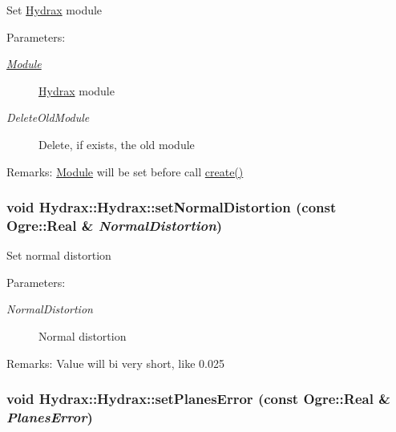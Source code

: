 Set \hyperlink{class_hydrax_1_1_hydrax}{Hydrax} module \begin{Desc}
\item[Parameters:]
\begin{description}
\item[{\em \hyperlink{namespace_hydrax_1_1_module}{Module}}]\hyperlink{class_hydrax_1_1_hydrax}{Hydrax} module \item[{\em DeleteOldModule}]Delete, if exists, the old module \end{description}
\end{Desc}
\begin{Desc}
\item[Remarks:]\hyperlink{namespace_hydrax_1_1_module}{Module} will be set before call \hyperlink{class_hydrax_1_1_hydrax_af840e19208614533a6b344e32965ee2}{create()} \end{Desc}
\hypertarget{class_hydrax_1_1_hydrax_b745c19968fdc47b71d65bb88679d447}{
\subsubsection[{setNormalDistortion}]{\setlength{\rightskip}{0pt plus 5cm}void Hydrax::Hydrax::setNormalDistortion (const Ogre::Real \& {\em NormalDistortion})}}
\label{class_hydrax_1_1_hydrax_b745c19968fdc47b71d65bb88679d447}


Set normal distortion \begin{Desc}
\item[Parameters:]
\begin{description}
\item[{\em NormalDistortion}]Normal distortion \end{description}
\end{Desc}
\begin{Desc}
\item[Remarks:]Value will bi very short, like 0.025 \end{Desc}
\hypertarget{class_hydrax_1_1_hydrax_336c1b2587e8e26c123af6c5bdbc2400}{
\subsubsection[{setPlanesError}]{\setlength{\rightskip}{0pt plus 5cm}void Hydrax::Hydrax::setPlanesError (const Ogre::Real \& {\em PlanesError})}}
\label{class_hydrax_1_1_hydrax_336c1b2587e8e26c123af6c5bdbc2400}


